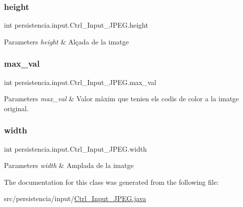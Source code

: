 \subsubsection{\texorpdfstring{height}{height}}
{\footnotesize\ttfamily int persistencia.\+input.\+Ctrl\+\_\+\+Input\+\_\+\+J\+P\+E\+G.\+height\hspace{0.3cm}{\ttfamily [package]}}


\begin{DoxyParams}{Parameters}
{\em height} & Alçada de la imatge \\
\hline
\end{DoxyParams}
\mbox{\label{classpersistencia_1_1input_1_1Ctrl__Input__JPEG_a8720235be6a11ef90085217064bbb1b0}} 
\subsubsection{\texorpdfstring{max\+\_\+val}{max\_val}}
{\footnotesize\ttfamily int persistencia.\+input.\+Ctrl\+\_\+\+Input\+\_\+\+J\+P\+E\+G.\+max\+\_\+val\hspace{0.3cm}{\ttfamily [package]}}


\begin{DoxyParams}{Parameters}
{\em max\+\_\+val} & Valor màxim que tenien els codis de color a la imatge original. \\
\hline
\end{DoxyParams}
\mbox{\label{classpersistencia_1_1input_1_1Ctrl__Input__JPEG_a07d902b25b54941dc0444398c7d380e7}} 
\subsubsection{\texorpdfstring{width}{width}}
{\footnotesize\ttfamily int persistencia.\+input.\+Ctrl\+\_\+\+Input\+\_\+\+J\+P\+E\+G.\+width\hspace{0.3cm}{\ttfamily [package]}}


\begin{DoxyParams}{Parameters}
{\em width} & Amplada de la imatge \\
\hline
\end{DoxyParams}


The documentation for this class was generated from the following file\+:\begin{DoxyCompactItemize}
\item 
src/persistencia/input/\hyperlink{Ctrl__Input__JPEG_8java}{Ctrl\+\_\+\+Input\+\_\+\+J\+P\+E\+G.\+java}\end{DoxyCompactItemize}
